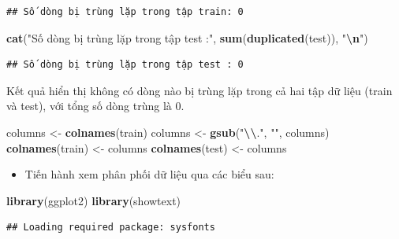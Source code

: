 \documentclass[
]{article}
\newenvironment{Shaded}{\begin{snugshade}}{\end{snugshade}}
\newcommand{\FunctionTok}[1]{\textcolor[rgb]{0.13,0.29,0.53}{\textbf{#1}}}
\newcommand{\NormalTok}[1]{#1}
\newcommand{\OtherTok}[1]{\textcolor[rgb]{0.56,0.35,0.01}{#1}}
\newcommand{\SpecialCharTok}[1]{\textcolor[rgb]{0.81,0.36,0.00}{\textbf{#1}}}
\newcommand{\StringTok}[1]{\textcolor[rgb]{0.31,0.60,0.02}{#1}}
\providecommand{\tightlist}{%
  \setlength{\itemsep}{0pt}\setlength{\parskip}{0pt}}
\begin{document}
\begin{verbatim}
## Số dòng bị trùng lặp trong tập train: 0
\end{verbatim}

\begin{Shaded}
\begin{Highlighting}[]
\FunctionTok{cat}\NormalTok{(}\StringTok{"Số dòng bị trùng lặp trong tập test :"}\NormalTok{, }\FunctionTok{sum}\NormalTok{(}\FunctionTok{duplicated}\NormalTok{(test)), }\StringTok{"}\SpecialCharTok{\textbackslash{}n}\StringTok{"}\NormalTok{)}
\end{Highlighting}
\end{Shaded}

\begin{verbatim}
## Số dòng bị trùng lặp trong tập test : 0
\end{verbatim}

Kết quả hiển thị không có dòng nào bị trùng lặp trong cả hai tập dữ liệu
(train và test), với tổng số dòng trùng là 0.

\begin{Shaded}
\begin{Highlighting}[]
\NormalTok{columns }\OtherTok{\textless{}{-}} \FunctionTok{colnames}\NormalTok{(train)}
\NormalTok{columns }\OtherTok{\textless{}{-}} \FunctionTok{gsub}\NormalTok{(}\StringTok{"}\SpecialCharTok{\textbackslash{}\textbackslash{}}\StringTok{."}\NormalTok{, }\StringTok{""}\NormalTok{, columns)}
\FunctionTok{colnames}\NormalTok{(train) }\OtherTok{\textless{}{-}}\NormalTok{ columns}
\FunctionTok{colnames}\NormalTok{(test) }\OtherTok{\textless{}{-}}\NormalTok{ columns}
\end{Highlighting}
\end{Shaded}

\begin{itemize}
\tightlist
\item
  Tiến hành xem phân phối dữ liệu qua các biểu sau:
\end{itemize}

\begin{Shaded}
\begin{Highlighting}[]
\FunctionTok{library}\NormalTok{(ggplot2)}
\FunctionTok{library}\NormalTok{(showtext)}
\end{Highlighting}
\end{Shaded}

\begin{verbatim}
## Loading required package: sysfonts
\end{verbatim}
\end{document}
